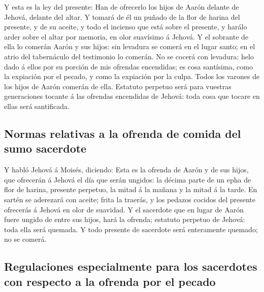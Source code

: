  Y esta es la ley del presente: Han de ofrecerlo los hijos
de Aarón delante de Jehová, delante del altar.  Y tomará de
él un puñado de la flor de harina del presente, y de su aceite, y todo
el incienso que está sobre el presente, y harálo arder sobre el altar
por memoria, en olor suavísimo á Jehová.  Y el sobrante de
ella lo comerán Aarón y sus hijos: sin levadura se comerá en el lugar
santo; en el atrio del tabernáculo del testimonio lo comerán.
 No se cocerá con levadura: helo dado á ellos por su
porción de mis ofrendas encendidas; es cosa santísima, como la expiación
por el pecado, y como la expiación por la culpa.  Todos los
varones de los hijos de Aarón comerán de ella. Estatuto perpetuo será
para vuestras generaciones tocante á las ofrendas encendidas de Jehová:
toda cosa que tocare en ellas será santificada.

\hypertarget{normas-relativas-a-la-ofrenda-de-comida-del-sumo-sacerdote}{%
\subsection{Normas relativas a la ofrenda de comida del sumo
sacerdote}\label{normas-relativas-a-la-ofrenda-de-comida-del-sumo-sacerdote}}

 Y habló Jehová á Moisés, diciendo:  Esta es
la ofrenda de Aarón y de sus hijos, que ofrecerán á Jehová el día que
serán ungidos: la décima parte de un epha de flor de harina, presente
perpetuo, la mitad á la mañana y la mitad á la tarde.  En
sartén se aderezará con aceite; frita la traerás, y los pedazos cocidos
del presente ofrecerás á Jehová en olor de suavidad.  Y el
sacerdote que en lugar de Aarón fuere ungido de entre sus hijos, hará la
ofrenda; estatuto perpetuo de Jehová: toda ella será quemada.
 Y todo presente de sacerdote será enteramente quemado; no
se comerá.

\hypertarget{regulaciones-especialmente-para-los-sacerdotes-con-respecto-a-la-ofrenda-por-el-pecado}{%
\subsection{Regulaciones especialmente para los sacerdotes con respecto
a la ofrenda por el
pecado}\label{regulaciones-especialmente-para-los-sacerdotes-con-respecto-a-la-ofrenda-por-el-pecado}}

